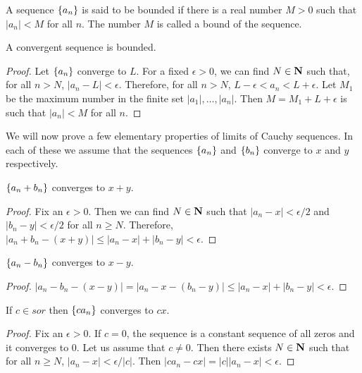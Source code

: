 \begin{defn}\label{c5s1d5}
A sequence $\{a_n\}$ is said to be bounded if there is a real number $M>0$
such that $|a_n| < M$ for all $n$. The number $M$ is called a bound of the
sequence.
\end{defn}

\begin{prop}\label{c5s1p6}
A convergent sequence is bounded.
\end{prop}
\begin{proof}
Let $\{a_n\}$ converge to $L$. For a fixed $\epsilon > 0$, we can find
$N \in \mathbf{N}$ such that, for all $n > N$, $|a_n - L| < \epsilon$. Therefore,
for all $n > N$, $L - \epsilon < a_n < L + \epsilon$. Let $M_1$ be the 
maximum number in the finite set $|a_1|, \ldots, |a_n|$. Then $M = M_1 + 
L + \epsilon$ is such that $|a_n| < M$ for all $n$.
\end{proof}

We will now prove a few elementary properties of limits of Cauchy sequences.
In each of these we assume that the sequences $\{a_n\}$ and $\{b_n\}$
converge to $x$ and $y$ respectively.
\begin{lem}\label{c5s1l1}
$\{a_n + b_n\}$ converges to $x + y$.
\end{lem}
\begin{proof}
Fix an $\epsilon > 0$. Then we can find $N \in \mathbf{N}$ such that $|a_n - x| <
\epsilon/2$ and $|b_n - y| < \epsilon/2$ for all $n \ge N$. Therefore,
$|a_n + b_n - (x + y)| \le |a_n - x| + |b_n - y| < \epsilon$.
\end{proof}

\begin{lem}\label{c5s1l2}
$\{a_n - b_n\}$ converges to $x - y$.
\end{lem}
\begin{proof}
$|a_n - b_n - (x - y)| = |a_n - x - (b_n - y)| \le |a_n - x| + |b_n - y| 
< \epsilon$.
\end{proof}

\begin{lem}\label{c5s1l3}
If $c \in sor$ then $\{ca_n\}$ converges to $cx$.
\end{lem}
\begin{proof}
Fix an $\epsilon > 0$. If $c = 0$, the sequence is a constant sequence of all
zeros and it converges to $0$. Let us assume that $c \ne 0$. Then there 
exists $N \in \mathbf{N}$ such that for all $n \ge N$, $|a_n - x| < \epsilon/|c|$. 
Then $|ca_n - cx| = |c||a_n - x| < \epsilon$.
\end{proof}

